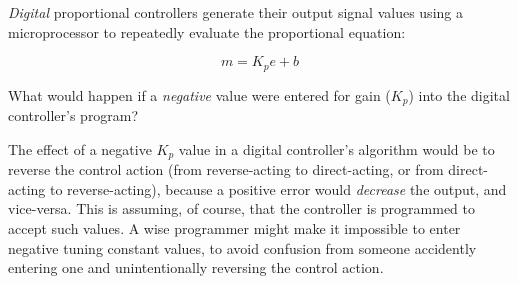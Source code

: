 

{\it Digital} proportional controllers generate their output signal values using a microprocessor to repeatedly evaluate the proportional equation:

$$m = K_p e + b$$
 
What would happen if a {\it negative} value were entered for gain ($K_p$) into the digital controller's program?







The effect of a negative $K_p$ value in a digital controller's algorithm would be to reverse the control action (from reverse-acting to direct-acting, or from direct-acting to reverse-acting), because a positive error would {\it decrease} the output, and vice-versa.  This is assuming, of course, that the controller is programmed to accept such values.  A wise programmer might make it impossible to enter negative tuning constant values, to avoid confusion from someone accidently entering one and unintentionally reversing the control action.











